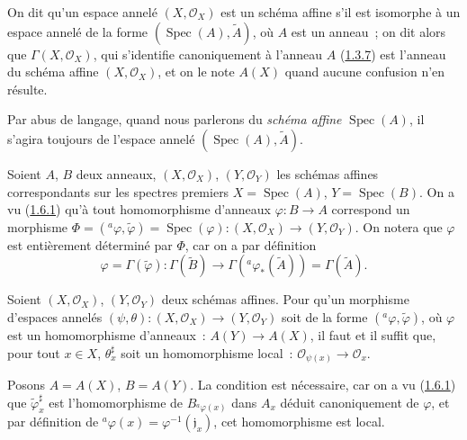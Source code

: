 \begin{definition}[1.7.1]
\label{I.1.7.1-fr}
On dit qu'un espace annelé $(X,\mathscr{O}_X)$ est un schéma affine
s'il est isomorphe à un espace annelé de la forme
$(\operatorname{Spec}(A),\widetilde A)$, où $A$ est un anneau~; on dit alors
que $\Gamma(X,\mathscr{O}_X)$, qui s'identifie canoniquement à l'anneau $A$
\textup{(\hyperref[I.1.3.7-fr]{1.3.7})} est l'anneau du schéma affine
$(X,\mathscr{O}_X)$, et on le note $A(X)$ quand aucune confusion n'en résulte.
\end{definition}

Par abus de langage, quand nous parlerons du \emph{schéma affine}
$\operatorname{Spec}(A)$, il s'agira toujours de l'espace annelé
$(\operatorname{Spec}(A),\widetilde A)$.

\begin{env}[1.7.2]
\label{I.1.7.2-fr}
Soient $A$, $B$ deux anneaux, $(X,\mathscr{O}_X)$,
$(Y,\mathscr{O}_Y)$ les schémas affines correspondants sur les spectres
premiers $X=\operatorname{Spec}(A)$, $Y=\operatorname{Spec}(B)$. On a vu
(\hyperref[I.1.6.1-fr]{1.6.1}) qu'à tout homomorphisme d'anneaux
$\varphi:B\to A$ correspond un morphisme
$\Phi=({}^a\varphi,\widetilde\varphi)=\operatorname{Spec}(\varphi):
(X,\mathscr{O}_X)\to(Y,\mathscr{O}_Y)$. On notera que $\varphi$ est
entièrement déterminé par $\Phi$, car on a par définition
\[
  \varphi=\Gamma(\widetilde\varphi):
  \Gamma(\widetilde B)\longrightarrow
  \Gamma({}^a\varphi_*(\widetilde A))=\Gamma(\widetilde A).
\]
\end{env}

\begin{theorem}[1.7.3]
\label{I.1.7.3-fr}
Soient $(X,\mathscr{O}_X)$, $(Y,\mathscr{O}_Y)$ deux schémas affines. Pour
qu'un morphisme d'espaces annelés
$(\psi,\theta):(X,\mathscr{O}_X)\to(Y,\mathscr{O}_Y)$ soit de la forme
$({}^a\varphi,\widetilde\varphi)$, où $\varphi$ est un homomorphisme
d'anneaux~: $A(Y)\to A(X)$, il faut et il suffit que, pour tout $x\in X$,
$\theta_x^{\sharp}$ soit un homomorphisme \textup{local}~:
$\mathscr{O}_{\psi(x)}\to\mathscr{O}_x$.
\end{theorem}

Posons $A=A(X)$, $B=A(Y)$. La condition est nécessaire, car on a vu
(\hyperref[I.1.6.1-fr]{1.6.1}) que $\widetilde\varphi_x^{\sharp}$ est
l'homomorphisme de $B_{{}^a\varphi(x)}$ dans $A_x$ déduit canoniquement de
$\varphi$, et par définition de
${}^a\varphi(x)=\varphi^{-1}(\mathfrak{j}_x)$, cet homomorphisme est local.

